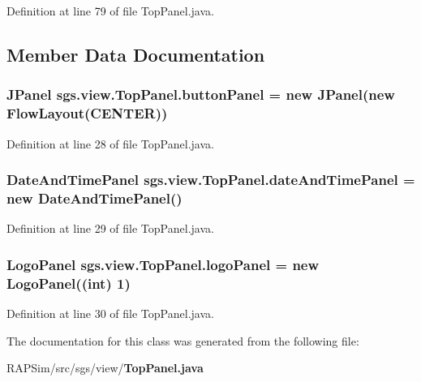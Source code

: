 Definition at line 79 of file Top\-Panel.\-java.



\subsection{Member Data Documentation}
\subsubsection[{button\-Panel}]{\setlength{\rightskip}{0pt plus 5cm}J\-Panel sgs.\-view.\-Top\-Panel.\-button\-Panel = new J\-Panel(new Flow\-Layout(C\-E\-N\-T\-E\-R))}\label{classsgs_1_1view_1_1_top_panel_a032fa607b34752171d58048a7916c0f4}


Definition at line 28 of file Top\-Panel.\-java.

\subsubsection[{date\-And\-Time\-Panel}]{\setlength{\rightskip}{0pt plus 5cm}Date\-And\-Time\-Panel sgs.\-view.\-Top\-Panel.\-date\-And\-Time\-Panel = new Date\-And\-Time\-Panel()}\label{classsgs_1_1view_1_1_top_panel_a975e76bedbeb2dc3454d9d344cac608c}


Definition at line 29 of file Top\-Panel.\-java.

\subsubsection[{logo\-Panel}]{\setlength{\rightskip}{0pt plus 5cm}Logo\-Panel sgs.\-view.\-Top\-Panel.\-logo\-Panel = new Logo\-Panel((int) 1)}\label{classsgs_1_1view_1_1_top_panel_aacad2ffa83f4bcbd462b416f1046ca13}


Definition at line 30 of file Top\-Panel.\-java.



The documentation for this class was generated from the following file\-:\begin{DoxyCompactItemize}
\item 
R\-A\-P\-Sim/src/sgs/view/{\bf Top\-Panel.\-java}\end{DoxyCompactItemize}
